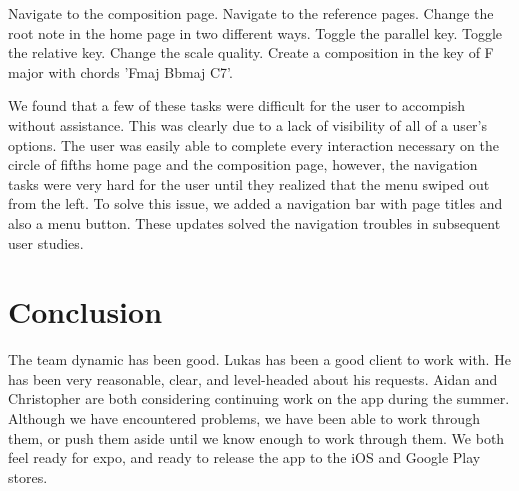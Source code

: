 \documentclass[onecolumn, draftclsnofoot,10pt, compsoc]{IEEEtran}
\begin{document}
\begin{outline}
\1 Navigate to the composition page.
\1 Navigate to the reference pages.
\1 Change the root note in the home page in two different ways.
\1 Toggle the parallel key.
\1 Toggle the relative key.
\1 Change the scale quality.
\1 Create a composition in the key of F major with chords 'Fmaj Bbmaj C7'.
\end{outline}

We found that a few of these tasks were difficult for the user to accompish without assistance. This was clearly due to a lack of visibility of all of a user's options. The user was easily able to complete every interaction necessary on the circle of fifths home page and the composition page, however, the navigation tasks were very hard for the user until they realized that the menu swiped out from the left. To solve this issue, we added a navigation bar with page titles and also a menu button. These updates solved the navigation troubles in subsequent user studies.

\section{Conclusion}

The team dynamic has been good.
Lukas has been a good client to work with.
He has been very reasonable, clear, and level-headed about his requests.
Aidan and Christopher are both considering continuing work on the app during the summer.
Although we have encountered problems, we have been able to work through them, or push them aside until we know enough to work through them.
We both feel ready for expo, and ready to release the app to the iOS and Google Play stores.
\end{document}
